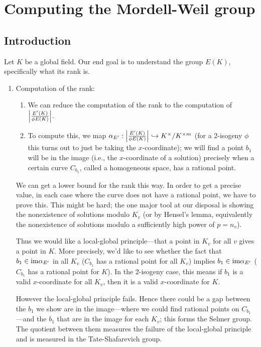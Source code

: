 \chapter{Computing the Mordell-Weil group}


\section*{Introduction}

Let $K$ be a global field. Our end goal is to understand the group $E(K)$, specifically what its rank is. 
\begin{enumerate}
\item
Computation of the rank:
\begin{enumerate}
\item
We can reduce the computation of the rank to the computation of $\left| {\frac{E'(K)}{\phi E(K)}} \right|$. 
\item
To compute this, we map $\alpha_{E'}:\left| {\frac{E'(K)}{\phi E(K)}} \right|\hookrightarrow K^{\times}/K^{\times m}$ (for a 2-isogeny $\phi$ this turns out to just be taking the $x$-coordinate); we will find a point $b_1$ will be in the image (i.e., the $x$-coordinate of a solution) precisely when a certain curve $C_{b_1}$, called a homogeneous space, has a rational point.
\end{enumerate}
We can get a lower bound for the rank this way. In order to get a precise value, in each case where the curve does not have a rational point, we have to prove this. This might be hard; the one major tool at our disposal is showing the nonexistence of solutions modulo $K_v$ (or by Hensel's lemma, equivalently the nonexistence of solutions modulo a sufficiently high power of $p=n_v$).

Thus we would like a local-global principle---that a point in $K_v$ for all $v$ gives a point in $K$. More precisely, we'd like to see whether the fact that $b_1\in \text{im}\alpha_{E'}$ in all $K_v$ ($C_{b_1}$ has a rational point for all $K_v$) implies $b_1\in \text{im}\alpha_{E'}$ ($C_{b_1}$ has a rational point for $K$). In the 2-isogeny case, this means if $b_1$ is a valid $x$-coordinate for all $K_v$, then it is a valid $x$-coordinate for $K$.

However the local-global principle fails. Hence there could be a gap between the $b_1$ we show are in the image---where we could find rational points on $C_{b_1}$---and the $b_1$ that are in the image for each $K_v$; this forms the Selmer group. The quotient between them measures the failure of the local-global principle and is measured in the Tate-Shafarevich group.
\end{enumerate}
%

